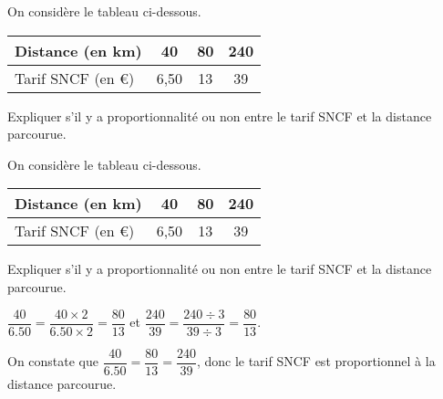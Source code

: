 \begin{exercice}
    On considère le tableau ci-dessous.

    \begin{tabular}{|l|c|c|c|}
        \hline
        Distance (en km)&40&80&240\\
        \hline
        Tarif SNCF (en €)&6,50&13&39\\
        \hline
    \end{tabular}

    \smallskip
    Expliquer s'il y a proportionnalité ou non entre le tarif SNCF et la distance parcourue.
\end{exercice}
\begin{corrige}
    On considère le tableau ci-dessous.

    \begin{tabular}{|l|c|c|c|}
        \hline
        Distance (en km)&40&80&240\\
        \hline
        Tarif SNCF (en €)&6,50&13&39\\
        \hline
    \end{tabular}
    
    \smallskip
    Expliquer s'il y a proportionnalité ou non entre le tarif SNCF et la distance parcourue.
    
    {\red $\dfrac{40}{\num{6.50}}=\dfrac{40\times 2}{\num{6.50}\times 2}=\dfrac{80}{13}$ et $\dfrac{240}{39}=\dfrac{240\div 3}{39\div 3}=\dfrac{80}{13}$.

    On constate que $\dfrac{40}{\num{6.50}}=\dfrac{80}{13}=\dfrac{240}{39}$, donc le tarif SNCF est proportionnel à la distance parcourue.
    }
\end{corrige}